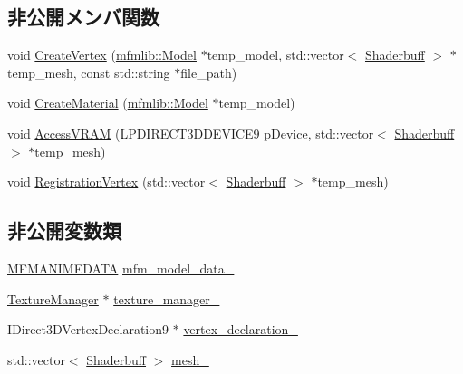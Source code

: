 \subsection*{非公開メンバ関数}
\begin{DoxyCompactItemize}
\item 
void \mbox{\hyperlink{class_model_f_b_x_object_a962ffe35009b920c09e2aaa3154051e4}{Create\+Vertex}} (\mbox{\hyperlink{classmfmlib_1_1_model}{mfmlib\+::\+Model}} $\ast$temp\+\_\+model, std\+::vector$<$ \mbox{\hyperlink{struct_model_f_b_x_object_1_1_shaderbuff}{Shaderbuff}} $>$ $\ast$temp\+\_\+mesh, const std\+::string $\ast$file\+\_\+path)
\item 
void \mbox{\hyperlink{class_model_f_b_x_object_a3fba4178f5a21dd3c180cb16f0a05106}{Create\+Material}} (\mbox{\hyperlink{classmfmlib_1_1_model}{mfmlib\+::\+Model}} $\ast$temp\+\_\+model)
\item 
void \mbox{\hyperlink{class_model_f_b_x_object_a930e90d4107466549946b1f318857954}{Access\+V\+R\+AM}} (L\+P\+D\+I\+R\+E\+C\+T3\+D\+D\+E\+V\+I\+C\+E9 p\+Device, std\+::vector$<$ \mbox{\hyperlink{struct_model_f_b_x_object_1_1_shaderbuff}{Shaderbuff}} $>$ $\ast$temp\+\_\+mesh)
\item 
void \mbox{\hyperlink{class_model_f_b_x_object_aa74ce889c6840f2a9d0fa54b420b9e2d}{Registration\+Vertex}} (std\+::vector$<$ \mbox{\hyperlink{struct_model_f_b_x_object_1_1_shaderbuff}{Shaderbuff}} $>$ $\ast$temp\+\_\+mesh)
\end{DoxyCompactItemize}
\subsection*{非公開変数類}
\begin{DoxyCompactItemize}
\item 
\mbox{\hyperlink{class_model_f_b_x_object_1_1_m_f_m_a_n_i_m_e_d_a_t_a}{M\+F\+M\+A\+N\+I\+M\+E\+D\+A\+TA}} \mbox{\hyperlink{class_model_f_b_x_object_a2dd981a6140173ff3ef10f4f6c633a6e}{mfm\+\_\+model\+\_\+data\+\_\+}}
\item 
\mbox{\hyperlink{class_texture_manager}{Texture\+Manager}} $\ast$ \mbox{\hyperlink{class_model_f_b_x_object_ab7f88e9b17a28e644d1967b2e39a450d}{texture\+\_\+manager\+\_\+}}
\item 
I\+Direct3\+D\+Vertex\+Declaration9 $\ast$ \mbox{\hyperlink{class_model_f_b_x_object_a7b592156afe70e5dd416967a44bc1470}{vertex\+\_\+declaration\+\_\+}}
\item 
std\+::vector$<$ \mbox{\hyperlink{struct_model_f_b_x_object_1_1_shaderbuff}{Shaderbuff}} $>$ \mbox{\hyperlink{class_model_f_b_x_object_a3e2d4d9bd6d754a18f3e1bf713ff5012}{mesh\+\_\+}}
\end{DoxyCompactItemize}


